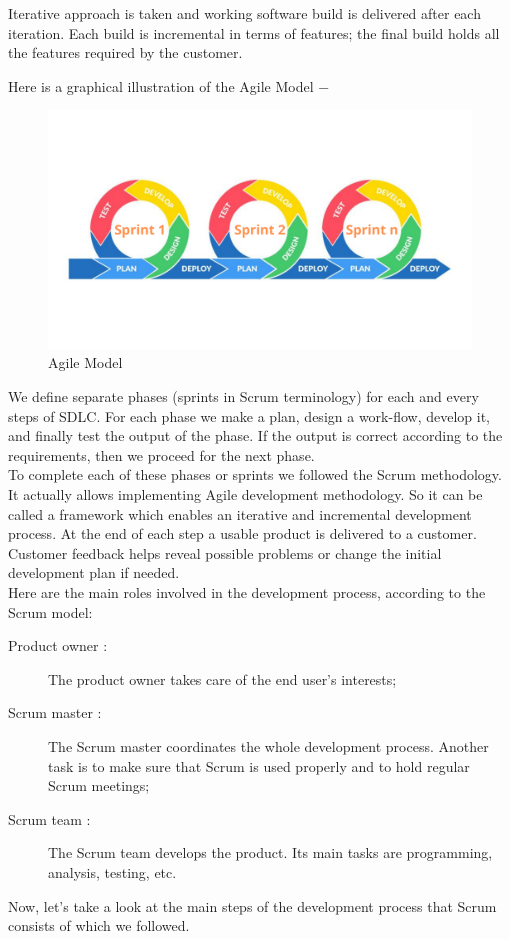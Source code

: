 Iterative approach is taken and working software build is delivered after each iteration. Each build is incremental in terms of features; the final build holds all the features required by the customer.


Here is a graphical illustration of the Agile Model −
\begin{figure}[H]
    \centering
    \includegraphics[width=1\textwidth]{images/agile}
    \caption{Agile Model}
    \label{fig:agile}
\end{figure}
We define separate phases (sprints in Scrum terminology) for each and every steps of SDLC. For each phase we make a plan, design a work-flow, develop it, and finally test the output of the phase. If the output is correct according to the requirements, then we proceed for the next phase.\\

To complete each of these phases or sprints we followed the Scrum methodology. It actually allows implementing Agile development methodology. So it can be called a framework which enables an iterative and incremental development process. At the end of each step a usable product is delivered to a customer. Customer feedback helps reveal possible problems or change the initial development plan if needed.\\
Here are the main roles involved in the development process, according to the Scrum model:
\begin{description}
\item[Product owner :] The product owner takes care of the end user’s interests;
\item[Scrum master :] The Scrum master coordinates the whole development process. Another task is to make sure that Scrum is used properly and to hold regular Scrum meetings;
\item[Scrum team :] The Scrum team develops the product. Its main tasks are programming, analysis, testing, etc.
\end{description}
Now, let’s take a look at the main steps of the development process that Scrum consists of which we followed.

